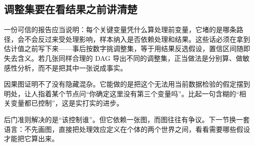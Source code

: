 \subsection{调整集要在看结果之前讲清楚}

一份可信的报告应当说明：每个关键变量凭什么算处理前变量，它堵的是哪条路径，会不会反过来受处理影响，样本纳入是否依赖处理和结果。这些话必须在拿到估计值之前写下来——事后按数字挑调整集，等于用结果反选假设，置信区间随即失去含义。若几张同样合理的 DAG 导出不同的调整集，正当做法是分别算、做敏感性分析，而不是把其中一张说成事实。

因果图证明不了没有隐藏混杂。它能做的是把这个无法用当前数据检验的假定摆到明处，让人指着某个节点问``你确定这里没有第三个变量吗''。比起一句含糊的``相关变量都已控制''，这是实打实的进步。

后门准则解决的是``该控制谁''。但它依赖一张图，而图往往有争议。下一节换一套语言：不先画图，直接把处理效应定义在个体的两个世界之间，看看需要哪些假设才能把它算出来。
